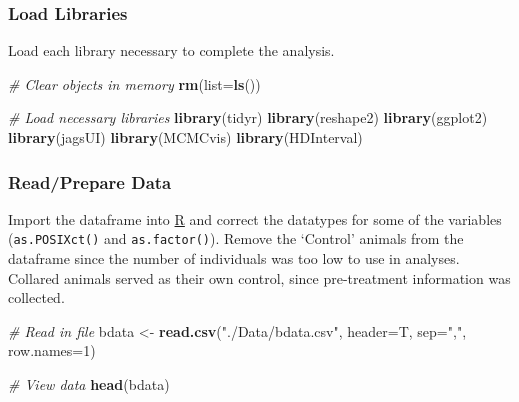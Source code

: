 \documentclass[]{article}
\newenvironment{Shaded}{\begin{snugshade}}{\end{snugshade}}
\newcommand{\CommentTok}[1]{\textcolor[rgb]{0.56,0.35,0.01}{\textit{#1}}}
\newcommand{\DataTypeTok}[1]{\textcolor[rgb]{0.13,0.29,0.53}{#1}}
\newcommand{\DecValTok}[1]{\textcolor[rgb]{0.00,0.00,0.81}{#1}}
\newcommand{\KeywordTok}[1]{\textcolor[rgb]{0.13,0.29,0.53}{\textbf{#1}}}
\newcommand{\NormalTok}[1]{#1}
\newcommand{\StringTok}[1]{\textcolor[rgb]{0.31,0.60,0.02}{#1}}
\begin{document}
\hypertarget{load-libraries}{%
\subsubsection{Load Libraries}\label{load-libraries}}

Load each library necessary to complete the analysis.

\begin{Shaded}
\begin{Highlighting}[]
\CommentTok{# Clear objects in memory}
\KeywordTok{rm}\NormalTok{(}\DataTypeTok{list=}\KeywordTok{ls}\NormalTok{())}

\CommentTok{# Load necessary libraries}
\KeywordTok{library}\NormalTok{(tidyr)}
\KeywordTok{library}\NormalTok{(reshape2)}
\KeywordTok{library}\NormalTok{(ggplot2)}
\KeywordTok{library}\NormalTok{(jagsUI)}
\KeywordTok{library}\NormalTok{(MCMCvis)}
\KeywordTok{library}\NormalTok{(HDInterval)}
\end{Highlighting}
\end{Shaded}

\hypertarget{readprepare-data}{%
\subsubsection{Read/Prepare Data}\label{readprepare-data}}

Import the dataframe into \href{https://cran.r-project.org/}{R} and
correct the datatypes for some of the variables (\texttt{as.POSIXct()}
and \texttt{as.factor()}). Remove the `Control' animals from the
dataframe since the number of individuals was too low to use in
analyses. Collared animals served as their own control, since
pre-treatment information was collected.

\begin{Shaded}
\begin{Highlighting}[]
\CommentTok{# Read in file}
\NormalTok{bdata <-}\StringTok{ }\KeywordTok{read.csv}\NormalTok{(}\StringTok{"./Data/bdata.csv"}\NormalTok{, }\DataTypeTok{header=}\NormalTok{T, }\DataTypeTok{sep=}\StringTok{","}\NormalTok{, }\DataTypeTok{row.names=}\DecValTok{1}\NormalTok{)}

\CommentTok{# View data}
\KeywordTok{head}\NormalTok{(bdata)}
\end{Highlighting}
\end{Shaded}
\end{document}
